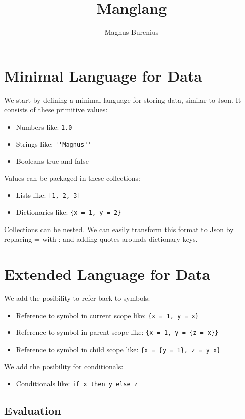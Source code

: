 \documentclass[a4paper,12pt]{article}
\title{Manglang}
\author{Magnus Burenius}
\begin{document}
\maketitle

\section{Minimal Language for Data}

We start by defining a minimal language for storing data, similar to Json. It consists of these primitive values:
\begin{itemize}
\item Numbers like: \lstinline|1.0|
\item Strings like: \lstinline|''Magnus''|
\item Booleans true and false
\end{itemize}
Values can be packaged in these collections:
\begin{itemize}
\item Lists like: \lstinline|[1, 2, 3]|
\item Dictionaries like: \lstinline|{x = 1, y = 2}|
\end{itemize}
Collections can be nested. We can easily transform this format to Json by replacing = with : and adding quotes arounds dictionary keys.

\section{Extended Language for Data}

We add the posibility to refer back to symbols:
\begin{itemize}
\item Reference to symbol in current scope like: \lstinline|{x = 1, y = x}|
\item Reference to symbol in parent scope like:  \lstinline|{x = 1, y = {z = x}}|
\item Reference to symbol in child scope like:  \lstinline|{x = {y = 1}, z = y x}|
\end{itemize}
We add the posibility for conditionals:
\begin{itemize}
\item Conditionals like: \lstinline|if x then y else z|
\end{itemize}

\subsection{Evaluation}
\end{document}
